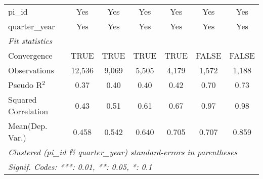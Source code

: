 \begin{tabular}{lcccccc}
   pi\_id                                                     & Yes          & Yes           & Yes           & Yes           & Yes           & Yes\\  
   quarter\_year                                              & Yes          & Yes           & Yes           & Yes           & Yes           & Yes\\  
   \midrule
   \emph{Fit statistics}\\
   Convergence                                                &TRUE          & TRUE          & TRUE          & TRUE          & FALSE         & FALSE\\  
   Observations                                               & 12,536       & 9,069         & 5,505         & 4,179         & 1,572         & 1,188\\  
   Pseudo R$^2$                                               & 0.37         & 0.40          & 0.40          & 0.42          & 0.70          & 0.73\\  
   Squared Correlation                                        & 0.43         & 0.51          & 0.61          & 0.67          & 0.97          & 0.98\\  
Mean(Dep. Var.) & 0.458 & 0.542 & 0.640 & 0.705 & 0.707 & 0.859 \\
   \midrule \midrule
   \multicolumn{7}{l}{\emph{Clustered (pi\_id \& quarter\_year) standard-errors in parentheses}}\\
   \multicolumn{7}{l}{\emph{Signif. Codes: ***: 0.01, **: 0.05, *: 0.1}}\\
\end{tabular}
\par\endgroup
